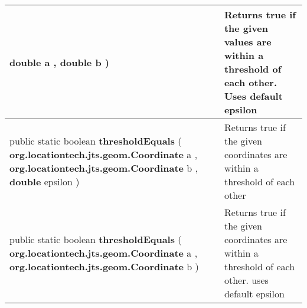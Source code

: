 {\begin{tabularx}{\linewidth}{X|m{}}
\begin{raggedleft}
\hspace*{ 5pt} \textbf{double} a , \newline
 \hspace*{ 5pt} \textbf{double} b  )
\end{raggedleft} &
 Returns true if the given values are within a threshold of each other. Uses default epsilon\\ \hline 
\begin{raggedleft}public static boolean \textbf{thresholdEquals }(\newline \hfill 
\hspace*{ 5pt} \textbf{org.locationtech.jts.geom.Coordinate} a , \newline
 \hspace*{ 5pt} \textbf{org.locationtech.jts.geom.Coordinate} b , \newline
 \hspace*{ 5pt} \textbf{double} epsilon  )
\end{raggedleft} &
 Returns true if the given coordinates are within a threshold of each other\\ \hline 
\begin{raggedleft}public static boolean \textbf{thresholdEquals }(\newline \hfill 
\hspace*{ 5pt} \textbf{org.locationtech.jts.geom.Coordinate} a , \newline
 \hspace*{ 5pt} \textbf{org.locationtech.jts.geom.Coordinate} b  )
\end{raggedleft} &
 Returns true if the given coordinates are within a threshold of each other. uses default epsilon\\\end{tabularx}
}
